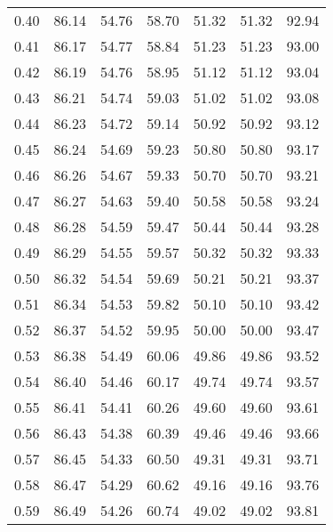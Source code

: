 \begin{tabular}{|c|c|c|c|c|c|c|}
      0.40 &     86.14 &     54.76 &      58.70 &   51.32 &      51.32 &         92.94 \\
      0.41 &     86.17 &     54.77 &      58.84 &   51.23 &      51.23 &         93.00 \\
      0.42 &     86.19 &     54.76 &      58.95 &   51.12 &      51.12 &         93.04 \\
      0.43 &     86.21 &     54.74 &      59.03 &   51.02 &      51.02 &         93.08 \\
      0.44 &     86.23 &     54.72 &      59.14 &   50.92 &      50.92 &         93.12 \\
      0.45 &     86.24 &     54.69 &      59.23 &   50.80 &      50.80 &         93.17 \\
      0.46 &     86.26 &     54.67 &      59.33 &   50.70 &      50.70 &         93.21 \\
      0.47 &     86.27 &     54.63 &      59.40 &   50.58 &      50.58 &         93.24 \\
      0.48 &     86.28 &     54.59 &      59.47 &   50.44 &      50.44 &         93.28 \\
      0.49 &     86.29 &     54.55 &      59.57 &   50.32 &      50.32 &         93.33 \\
      0.50 &     86.32 &     54.54 &      59.69 &   50.21 &      50.21 &         93.37 \\
      0.51 &     86.34 &     54.53 &      59.82 &   50.10 &      50.10 &         93.42 \\
      0.52 &     86.37 &     54.52 &      59.95 &   50.00 &      50.00 &         93.47 \\
      0.53 &     86.38 &     54.49 &      60.06 &   49.86 &      49.86 &         93.52 \\
      0.54 &     86.40 &     54.46 &      60.17 &   49.74 &      49.74 &         93.57 \\
      0.55 &     86.41 &     54.41 &      60.26 &   49.60 &      49.60 &         93.61 \\
      0.56 &     86.43 &     54.38 &      60.39 &   49.46 &      49.46 &         93.66 \\
      0.57 &     86.45 &     54.33 &      60.50 &   49.31 &      49.31 &         93.71 \\
      0.58 &     86.47 &     54.29 &      60.62 &   49.16 &      49.16 &         93.76 \\
      0.59 &     86.49 &     54.26 &      60.74 &   49.02 &      49.02 &         93.81 \\

\end{tabular}
